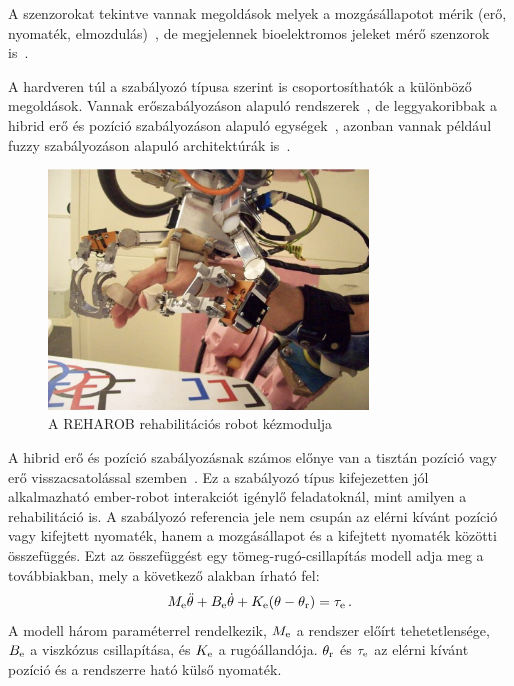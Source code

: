A szenzorokat tekintve vannak megoldások melyek a mozgásállapotot mérik (erő, nyomaték, elmozdulás)~\citep{Bauer2021}, de megjelennek 
bioelektromos jeleket mérő szenzorok is~\citep{Satakogiou}. 

A hardveren túl a szabályozó típusa szerint is csoportosíthatók a különböző megoldások. Vannak erőszabályozáson 
alapuló rendszerek~\citep{kovacs2003dynamics}, de leggyakoribbak a hibrid erő és 
pozíció szabályozáson alapuló egységek~\citep{Hua2019,Xie2021}, azonban vannak például fuzzy szabályozáson alapuló architektúrák is~\citep{Hu2023}.

\begin{figure}[b!]
	\begin{center}
		\includegraphics[width=8.5cm]{images/reharob_hand_module.png}
		\caption{A REHAROB rehabilitációs robot kézmodulja}\label{fig:reharob_hand_module}
	\end{center}
\end{figure}

A hibrid erő és pozíció szabályozásnak számos előnye van a tisztán pozíció vagy erő visszacsatolással 
szemben~\citep{hogan1984Impedance,hogan1985ImpedancePART1,hogan1985ImpedancePART2,hogan1985ImpedancePART3,kovacs2003dynamics,stepan2001vibrations}.
Ez a szabályozó típus kifejezetten jól alkalmazható ember-robot interakciót igénylő feladatoknál, mint amilyen 
a rehabilitáció is. A szabályozó referencia jele nem csupán 
az elérni kívánt pozíció vagy kifejtett nyomaték, hanem a mozgásállapot és a kifejtett
nyomaték közötti összefüggés. Ezt az összefüggést egy 
tömeg-rugó-csillapítás modell adja meg a továbbiakban, mely a következő alakban
írható fel: 
\begin{align}
    M_{\mathrm{e}} \ddot \theta + B_{\mathrm{e}} \dot \theta + K_{\mathrm{e}} (\theta - \theta_{\mathrm{r}}) = \tau_{\mathrm{e}}\,.
\end{align}
A modell három paraméterrel rendelkezik, $M_{\mathrm{e}}$ a rendszer előírt tehetetlensége, 
$B_{\mathrm{e}}$ a viszkózus csillapítása, és $K_{\mathrm{e}}$ a rugóállandója. 
$\theta_{\mathrm{r}}$ és $\tau_{\mathrm{e}}$ az elérni kívánt pozíció és a rendszerre ható külső nyomaték. 



